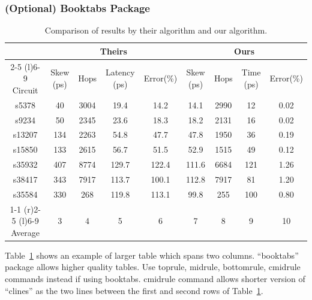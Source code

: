 \documentclass{jcse}
\begin{document}
\subsubsection{(Optional) Booktabs Package}

\begin{table}
\centering
\caption{Comparison of results by their algorithm \cite{Zongker2006} and our algorithm.}
\label{t:cmp}
\begin{tabular} {ccccccccc}

\toprule
        & \multicolumn{4}{c}{Theirs \cite{Zongker2006}}  & \multicolumn{4}{c}{Ours} \\
\cmidrule(r){2-5} \cmidrule(l){6-9}
Circuit & Skew (ps) & Hops & Latency (ps) & Error(\%)    & Skew (ps) & Hops & Time (ps) & Error(\%) \\
\midrule
s5378   & 40        & 3004 & 19.4         & 14.2         & 14.1      & 2990 & 12        & 0.02 \\
s9234   & 50        & 2345 & 23.6         & 18.3         & 18.2      & 2131 & 16        & 0.02 \\
s13207  & 134       & 2263 & 54.8         & 47.7         & 47.8      & 1950 & 36        & 0.19 \\
s15850  & 133       & 2615 & 56.7         & 51.5         & 52.9      & 1515 & 49        & 0.12 \\
s35932  & 407       & 8774 & 129.7        & 122.4        & 111.6     & 6684 & 121       & 1.26 \\
s38417  & 343       & 7917 & 113.7        & 100.1        & 112.8     & 7917 & 81        & 1.20 \\
s35584  & 330       & 268  & 119.8        & 113.1        & 99.8      & 255  & 100       & 0.80 \\
\cmidrule(lr){1-1} \cmidrule(r){2-5} \cmidrule(l){6-9}
Average & 3         & 4    & 5            & 6            & 7         & 8    & 9         & 10   \\
\midrule

\end{tabular}
\end{table}

Table~\ref{t:cmp} shows an example of larger table which spans two columns.
``booktabs'' package allows higher quality tables.
Use toprule, midrule, bottomrule, cmidrule commands instead if using booktabs.
cmidrule command allows shorter version of ``clines'' as the two lines
between the first and second rows of Table~\ref{t:cmp}.
\end{document}
